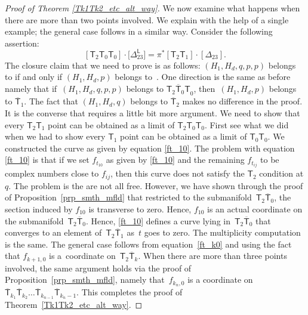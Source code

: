 \documentclass[pdftex]{sigma}
\numberwithin{equation}{section}
\begin{document}
\begin{proof}[Proof of Theorem \ref{Tk1Tk2_etc_alt_way}]
We now examine what happens when there are more than two points involved.
We explain with the help of a single example; the general case follows in a similar way.
Consider the following assertion:
\[
[\mathsf{T}_2 \mathsf{T}_0 \mathsf{T}_0] \cdot \bigl[\Delta^{\mathsf{L}}_{23}\bigr]  =
\pi^*[\mathsf{T}_2\mathsf{T}_1]\cdot [\Delta_{23}].
\]
The closure claim that we need to prove is as follows:
$(H_1, H_d, q, p, p)$ belongs to 
if and only if $(H_1, H_d, p)$ belongs to~.
One direction is the same as before namely that if~${(H_1, H_d, q, p, p)}$ belongs to
$\overline{\mathsf{T}_2\mathsf{T}_0 \mathsf{T}}_0$, then~$(H_1, H_d, p)$ belongs to $\overline{\mathsf{T}}_{1}$. The fact that
$(H_1, H_d, q)$ belongs to $\overline{\mathsf{T}}_2$ makes no difference in the proof.
It is the converse that requires a little bit more argument. We need to show that
every $\mathsf{T}_2 \mathsf{T}_1$ point can be obtained as a limit of
$\mathsf{T}_2 \mathsf{T}_0 \mathsf{T}_0$. First see what we did when we
had to show every $\mathsf{T}_1$ point can be obtained as a limit of
$\mathsf{T}_0 \mathsf{T}_0$. We constructed the curve as given by equation
\eqref{ft_10}. The problem with equation \eqref{ft_10} is that if we set
$f_{t_{10}}$ as given by \eqref{ft_10} and the remaining $f_{t_{ij}}$ to be
complex numbers close to $f_{ij}$, then this curve does not satisfy the
$\mathsf{T}_2$ condition at $q$. The problem is the  are not all free.
However, we have shown through the proof of Proposition~\ref{prp_smth_mfld} that
restricted to the submanifold~$\mathsf{T}_2 \overline{\mathsf{T}}_0$, the section induced by $f_{10}$ is transverse to
zero. Hence, $f_{10}$ is an actual coordinate on the submanifold~$\mathsf{T}_2 \overline{\mathsf{T}}_0$.
Hence, \eqref{ft_10} defines a curve lying in~$\mathsf{T}_2 \overline{\mathsf{T}}_0$ that
converges to an element of~$\mathsf{T}_2 \overline{\mathsf{T}}_1$ as~$t$ goes to zero.
The multiplicity computation is the same. The general case follows from equation~\eqref{ft_k0} and using the fact that $f_{k+1, 0}$ is a~coordinate on~$\mathsf{T}_2 \overline{\mathsf{T}}_{k}$. When there are more than three points involved, the
same argument holds via the proof of Proposition~\ref{prp_smth_mfld},
namely that~$f_{k_n, 0}$ is a coordinate on
$\overline{\mathsf{T}}_{k_1} \overline{\mathsf{T}}_{k_2}
\dots \overline{\mathsf{T}}_{k_{n-1}}\overline{\mathsf{T}}_{k_{n}-1}$.
This completes the proof of Theorem~\ref{Tk1Tk2_etc_alt_way}.
 \end{proof}
\end{document}
